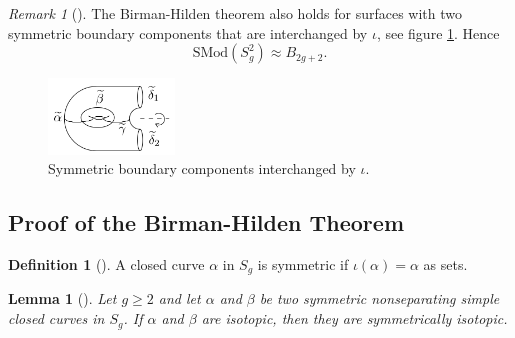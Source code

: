 \documentclass[reqno]{amsart}
\newtheorem{lemma}[theorem]{Lemma}
\theoremstyle{definition}
\newtheorem{definition}[theorem]{Definition}
\theoremstyle{remark}
\newtheorem*{remark}{Remark}
\newcommand{\SMod}{{\mathrm{SMod}}}
\begin{document}
   \begin{remark}[]
       The Birman-Hilden theorem also holds for
       surfaces with two symmetric boundary
       components that are interchanged by
       $\iota$, see figure
       \ref{fig:-Birman-Hilden-two-symmetric-boundary-components-png}.
       Hence
       \[
       \SMod \left( S_g^{2} \right) 
       \approx B_{2g+2}.
       \] 

        \begin{figure}[htpb]
           \centering
           \includegraphics[width=0.3\textwidth]{
           Birman-Hilden-two-symmetric-boundary-components.png}
           \caption{Symmetric boundary components
           interchanged by $\iota$.}
           \label{fig:-Birman-Hilden-two-symmetric-boundary-components-png}
       \end{figure}
   \end{remark}





   \subsection{Proof of the Birman-Hilden Theorem}

   \begin{definition}[]
       A closed curve $\alpha$ in $S_g$ is symmetric
       if $\iota \left( \alpha \right) = \alpha$ as sets.
   \end{definition}

   \begin{lemma}[]
       Let $g \ge 2$ and let $\alpha$ and $\beta$ be
       two symmetric nonseparating simple closed
       curves in $S_g$. If $\alpha$ and $\beta$ are isotopic,
       then they are symmetrically isotopic.
   \end{lemma}
\end{document}
